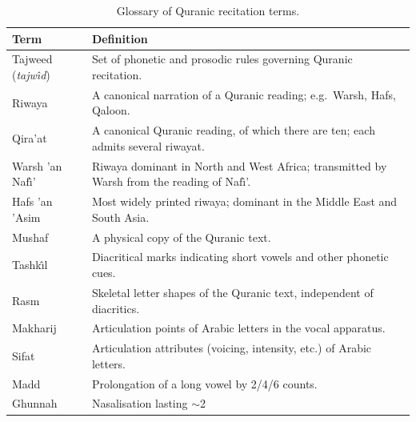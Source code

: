 \documentclass[12pt,a4paper]{report}
\begin{document}
\begin{table}[H]
  \centering
  \caption{Glossary of Quranic recitation terms.}
  \label{tab:mt_glossary_quran}
  \renewcommand{\arraystretch}{1.3}
  \begin{tabular}{lp{9cm}}
    \toprule
    \textbf{Term} & \textbf{Definition} \\
    \midrule
    Tajweed (\textit{tajw{\^\i}d}) & Set of phonetic and prosodic rules
                                     governing Quranic recitation. \\
    Riwaya                          & A canonical narration of a Quranic
                                     reading; e.g.\ Warsh, Hafs, Qaloon. \\
    Qira'at                         & A canonical Quranic reading, of
                                     which there are ten; each admits
                                     several riwayat. \\
    Warsh 'an Naf{\^\i}'            & Riwaya dominant in North and West
                                     Africa; transmitted by Warsh from
                                     the reading of Naf{\^\i}'. \\
    Hafs 'an 'Asim                  & Most widely printed riwaya;
                                     dominant in the Middle East and
                                     South Asia. \\
    Mushaf                          & A physical copy of the Quranic
                                     text. \\
    Tashk{\^\i}l                    & Diacritical marks indicating short
                                     vowels and other phonetic cues. \\
    Rasm                            & Skeletal letter shapes of the
                                     Quranic text, independent of
                                     diacritics. \\
    Makharij                        & Articulation points of Arabic
                                     letters in the vocal apparatus. \\
    Sifat                           & Articulation attributes (voicing,
                                     intensity, etc.) of Arabic letters. \\
    Madd                            & Prolongation of a long vowel by
                                     2/4/6 counts. \\
    Ghunnah                         & Nasalisation lasting $\sim$2

\end{tabular}
\end{table}
\end{document}
